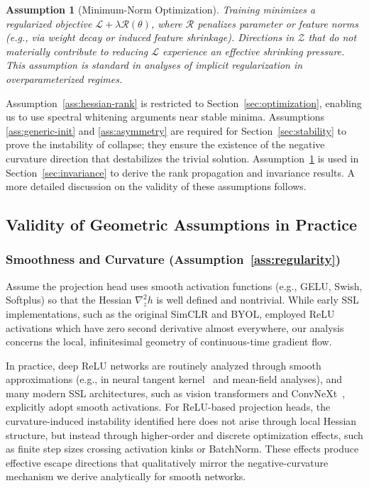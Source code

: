 \documentclass{article}
\theoremstyle{plain}
\newtheorem{assumption}{Assumption}
\theoremstyle{definition}
\theoremstyle{remark}
\begin{document}
\begin{assumption}[Minimum-Norm Optimization]
\label{ass:min-norm}
Training minimizes a regularized objective $\mathcal{L} + \lambda \mathcal{R}(\theta)$, where $\mathcal{R}$ penalizes parameter or feature norms (e.g., via weight decay or induced feature shrinkage). Directions in $\mathcal{Z}$ that do not materially contribute to reducing $\mathcal{L}$ experience an effective shrinking pressure. This assumption is standard in analyses of implicit regularization in overparameterized regimes.
\end{assumption}

Assumption~\ref{ass:hessian-rank} is restricted to Section~\ref{sec:optimization}, enabling us to use spectral whitening arguments near stable minima. Assumptions \ref{ass:generic-init} and \ref{ass:asymmetry} are required for Section~\ref{sec:stability} to prove the instability of collapse; they ensure the existence of the negative curvature direction that destabilizes the trivial solution. Assumption~\ref{ass:min-norm} is used in Section~\ref{sec:invariance} to derive the rank propagation and invariance results. A more detailed discussion on the validity of these assumptions follows.

\subsection{Validity of Geometric Assumptions in Practice}

\subsubsection{Smoothness and Curvature (Assumption~\ref{ass:regularity})}
\label{app:smoothness}

Assume the projection head uses smooth activation functions (e.g., GELU, Swish, Softplus) so that the Hessian $\nabla^2_z h$ is well defined and nontrivial. While early SSL implementations, such as the original SimCLR and BYOL, employed ReLU activations which have zero second derivative almost everywhere, our analysis concerns the local, infinitesimal geometry of continuous-time gradient flow.

In practice, deep ReLU networks are routinely analyzed through smooth approximations (e.g., in neural tangent kernel~\citep{jacot2020ntk} and mean-field analyses), and many modern SSL architectures, such as vision transformers and ConvNeXt~\citep{dosovitskiy2021imageworth16x16words, liu2022convnet2020s}, explicitly adopt smooth activations. For ReLU-based projection heads, the curvature-induced instability identified here does not arise through local Hessian structure, but instead through higher-order and discrete optimization effects, such as finite step sizes crossing activation kinks or BatchNorm. These effects produce effective escape directions that qualitatively mirror the negative-curvature mechanism we derive analytically for smooth networks.
\end{document}
